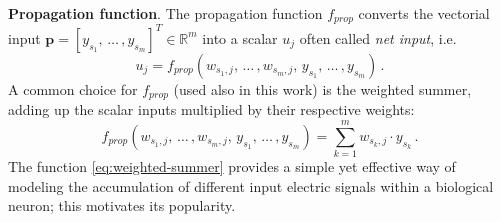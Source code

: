 \documentclass[11pt, a4paper]{report}
\theoremstyle{theorem}
\numberwithin{equation}{section}
\numberwithin{figure}{section}
\begin{document}
		\vspace*{0.3cm}
		
		\noindent \textbf{Propagation function}. The propagation function $f_{prop}$ converts the vectorial input $\boldsymbol{p} = [y_{s_1}, \, \ldots \, , y_{s_m}]^T \in \mathbb{R}^m$ into a scalar $u_{j}$ often called \emph{net input}, i.e.
		\begin{equation}
			\label{eq:propagation-function}
			u_{j} = f_{prop}(w_{s_1,j}, \, \ldots \, , w_{s_m,j}, \, y_{s_1}, \, \ldots \, , y_{s_m}) \, .
		\end{equation}
		A common choice for $f_{prop}$ (used also in this work) is the weighted summer, adding up the scalar inputs multiplied by their respective weights:
		\begin{equation}
			\label{eq:weighted-summer}
			f_{prop}(w_{s_1,j}, \, \ldots \, , w_{s_m,j}, \, y_{s_1}, \, \ldots \, , y_{s_m}) = \sum_{k = 1}^m w_{s_k,j} \cdot y_{s_k} \, .
		\end{equation} 
		The function \eqref{eq:weighted-summer} provides a simple yet effective way of modeling the accumulation of different input electric signals within a biological neuron; this motivates its popularity.
		
		\vspace*{0.3cm}
		
\end{document}
